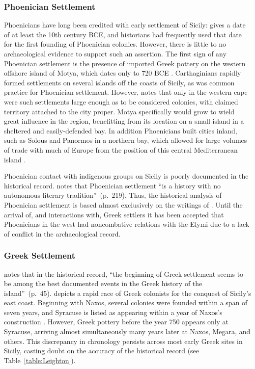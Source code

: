 \documentclass[american]{../../../coursework}
\begin{document}
\subsubsection{Phoenician Settlement}

Phoenicians have long been credited with early settlement of Sicily:
\citeauthor{Thucydides} gives a date of at least the 10th century BCE, and
historians had frequently used that date for the first founding of Phoenician
colonies. However, there is little to no archaeological evidence to support
such an assertion. The first sign of any Phoenician settlement is the presence
of imported Greek pottery on the western offshore island of Motya, which dates
only to 720 BCE \parencite{Lei99}. Carthaginians rapidly formed settlements on
several islands off the coasts of Sicily, as was common practice for
Phoenician settlement. However, \textcite{Fre92} notes that only in the
western cape were such settlements large enough as to be considered colonies,
with claimed territory attached to the city proper. Motya specifically would
grow to wield great influence in the region, benefitting from its location on
a small island in a sheltered and easily-defended bay. In addition Phoenicians
built cities inland, such as Solous and Panormos in a northern bay, which
allowed for large volumes of trade with much of Europe from the position of
this central Mediterranean island \parencite{Fre92}.

Phoenician contact with indigenous groups on Sicily is poorly documented in
the historical record. \textcite{Lei99} notes that Phoenician settlement ``is
a history with no autonomous literary tradition''~(p.~219). Thus, the
historical analysis of Phoenician settlement is based almost exclusively on
the writings of \citeauthor{Thucydides}. Until the arrival of, and
interactions with, Greek settlers it has been accepted that Phoenicians in the
west had noncombative relations with the Elymi due to a lack of conflict in
the archaeological record.

\subsubsection{Greek Settlement}

\textcite{Hol91} notes that in the historical record, ``the beginning of Greek
settlement seems to be among the best documented events in the Greek history
of the island''~(p.~45). \citeauthor{Thucydides} depicts a rapid race of Greek
colonists for the conquest of Sicily's east coast. Beginning with Naxos,
several colonies were founded within a span of seven years, and Syracuse is
listed as appearing within a year of Naxos's construction
\parencite[VI.3]{Thucydides}. However, Greek pottery before the year 750
appears only at Syracuse, arriving almost simultaneously many years later at
Naxos, Megara, and others. This discrepancy in chronology persists across most
early Greek sites in Sicily, casting doubt on the accuracy of the historical
record (see Table~\ref{table:Leighton}).
\end{document}
